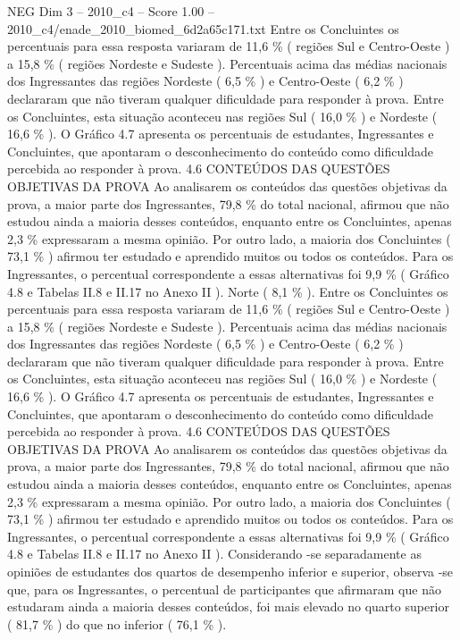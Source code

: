 \begin{textsample}{NEG Dim 3 – 2010\_c4 – Score 1.00 – 2010\_c4/enade\_2010\_biomed\_6d2a65c171.txt}
Entre os Concluintes os percentuais para essa resposta variaram de 11,6 \% ( regiões Sul e Centro-Oeste ) a 15,8 \% ( regiões Nordeste e Sudeste ).
Percentuais acima das médias nacionais dos Ingressantes das regiões Nordeste ( 6,5 \% ) e Centro-Oeste ( 6,2 \% ) declararam que não tiveram qualquer dificuldade para responder à prova.
Entre os Concluintes, esta situação aconteceu nas regiões Sul ( 16,0 \% ) e Nordeste ( 16,6 \% ).
O Gráfico 4.7 apresenta os percentuais de estudantes, Ingressantes e Concluintes, que apontaram o desconhecimento do conteúdo como dificuldade percebida ao responder à prova. 4.6 CONTEÚDOS DAS QUESTÕES OBJETIVAS DA PROVA Ao analisarem os conteúdos das questões objetivas da prova, a maior parte dos Ingressantes, 79,8 \% do total nacional, afirmou que não estudou ainda a maioria desses conteúdos, enquanto entre os Concluintes, apenas 2,3 \% expressaram a mesma opinião.
Por outro lado, a maioria dos Concluintes ( 73,1 \% ) afirmou ter estudado e aprendido muitos ou todos os conteúdos.
Para os Ingressantes, o percentual correspondente a essas alternativas foi 9,9 \% ( Gráfico 4.8 e Tabelas II.8 e II.17 no Anexo II ).
Norte ( 8,1 \% ).
Entre os Concluintes os percentuais para essa resposta variaram de 11,6 \% ( regiões Sul e Centro-Oeste ) a 15,8 \% ( regiões Nordeste e Sudeste ).
Percentuais acima das médias nacionais dos Ingressantes das regiões Nordeste ( 6,5 \% ) e Centro-Oeste ( 6,2 \% ) declararam que não tiveram qualquer dificuldade para responder à prova.
Entre os Concluintes, esta situação aconteceu nas regiões Sul ( 16,0 \% ) e Nordeste ( 16,6 \% ).
O Gráfico 4.7 apresenta os percentuais de estudantes, Ingressantes e Concluintes, que apontaram o desconhecimento do conteúdo como dificuldade percebida ao responder à prova. 4.6 CONTEÚDOS DAS QUESTÕES OBJETIVAS DA PROVA Ao analisarem os conteúdos das questões objetivas da prova, a maior parte dos Ingressantes, 79,8 \% do total nacional, afirmou que não estudou ainda a maioria desses conteúdos, enquanto entre os Concluintes, apenas 2,3 \% expressaram a mesma opinião.
Por outro lado, a maioria dos Concluintes ( 73,1 \% ) afirmou ter estudado e aprendido muitos ou todos os conteúdos.
Para os Ingressantes, o percentual correspondente a essas alternativas foi 9,9 \% ( Gráfico 4.8 e Tabelas II.8 e II.17 no Anexo II ).
Considerando -se separadamente as opiniões de estudantes dos quartos de desempenho inferior e superior, observa -se que, para os Ingressantes, o percentual de participantes que afirmaram que não estudaram ainda a maioria desses conteúdos, foi mais elevado no quarto superior ( 81,7 \% ) do que no inferior ( 76,1 \% ).

\end{textsample}
